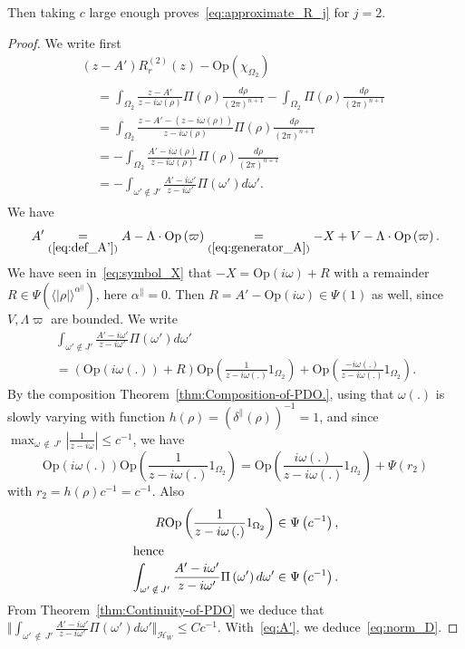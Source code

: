 \documentclass[AHL,Unicode,longabstracts,published]{cedram}
\newcommand*\eq[1]{\underset{(#1)}{=}}
\newcommand{\clH}{\mathcal{H}}
\newcommand{\Opp}{\mathrm{Op}}
\newcommand{\clH}{\mathcal{H}}
\begin{document}
Then taking $c$ large enough proves~\eqref{eq:approximate_R_j} for $j=2$.
\begin{proof}
We write first
\begin{multline}\label{eq:A'}
\left(z-A'\right)R_{r}^{\left(2\right)}\left(z\right)-\Opp \left(\chi_{\Omega_{2}}\right)\\
\begin{aligned}
& =\int_{\Omega_{2}}\frac{z-A'}{z-i\omega\left(\rho\right)}\Pi\left(\rho\right)\frac{d\rho}{\left(2\pi\right)^{n+1}}-\int_{\Omega_{2}}\Pi\left(\rho\right)\frac{d\rho}{\left(2\pi\right)^{n+1}}\\
& =\int_{\Omega_{2}}\frac{z-A'-\left(z-i\omega\left(\rho\right)\right)}{z-i\omega\left(\rho\right)}\Pi\left(\rho\right)\frac{d\rho}{\left(2\pi\right)^{n+1}}\\
& =-\int_{\Omega_{2}}\frac{A'-i\omega\left(\rho\right)}{z-i\omega\left(\rho\right)}\Pi\left(\rho\right)\frac{d\rho}{\left(2\pi\right)^{n+1}}\\
& =-\int_{\omega'\notin J'}\frac{A'-i\omega'}{z-i\omega'}\Pi\left(\omega'\right)d\omega'.
\end{aligned}
\end{multline}
We have
\[
A'\eq{\ref{eq:def_A'}}A-\Lambda\cdot\Opp \left(\varpi\right)\eq{\ref{eq:generator_A}}-X+V-\Lambda\cdot\Opp \left(\varpi\right).
\]
We have seen in~\eqref{eq:symbol_X} that $-X=\Opp (i\omega)+R$ with a remainder $R\in\Psi(\langle|\rho|\rangle^{\alpha^{\parallel}})$, here $\alpha^{\parallel}=0$. Then $R=A'-\Opp (i\omega)\in\Psi(1)$ as well, since $V,\Lambda\varpi$ are bounded. We write
\begin{multline*}
\int_{\omega'\notin J'}\frac{A'-i\omega'}{z-i\omega'}\Pi\left(\omega'\right)d\omega'\\
=\left(\Opp \left(i\omega\left(.\right)\right)+R\right)\Opp \left(\frac{1}{z-i\omega\left(.\right)}\mathrm{1}_{\Omega_{2}}\right)+\Opp \left(\frac{-i\omega\left(.\right)}{z-i\omega\left(.\right)}\mathrm{1}_{\Omega_{2}}\right).
\end{multline*}
By the composition Theorem~\ref{thm:Composition-of-PDO.}, using that $\omega(.)$ is slowly varying with function $h(\rho)=(\delta^{\parallel}(\rho))^{-1}=1$, and since $\max_{\omega\,\notin\,J'}|\frac{1}{z-i\omega}|\leq c^{-1}$, we have
\[
\Opp \left(i\omega\left(.\right)\right)\Opp \left(\frac{1}{z-i\omega\left(.\right)}\mathrm{1}_{\Omega_{2}}\right)=\Opp \left(\frac{i\omega\left(.\right)}{z-i\omega\left(.\right)}\mathrm{1}_{\Omega_{2}}\right)+\Psi\left(r_{2}\right)
\]
with $r_{2}=h(\rho)c^{-1}=c^{-1}$. Also
\begin{align*}
R\Opp \left(\frac{1}{z-i\omega\left(.\right)}\mathrm{1}_{\Omega_{2}}\right) &\in\Psi\left(c^{-1}\right),
\\
\intertext{hence}
\int_{\omega'\,\notin\,J'}\frac{A'-i\omega'}{z-i\omega'}\Pi\left(\omega'\right)d\omega' &\in\Psi\left(c^{-1}\right).
\end{align*}
From Theorem~\ref{thm:Continuity-of-PDO} we deduce that $\Vert \int_{\omega'\,\notin\,J'}\frac{A'-i\omega'}{z-i\omega'}\Pi(\omega')d\omega'\Vert _{\clH _{W}}\leq Cc^{-1}$. With~\eqref{eq:A'}, we deduce~\eqref{eq:norm_D}.
\end{proof}
\end{document}
